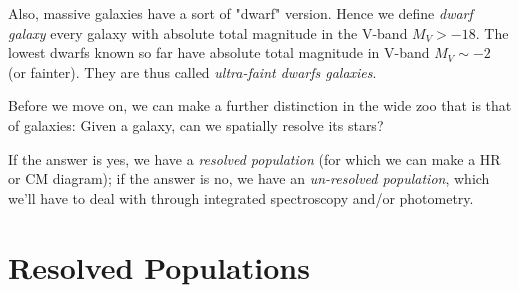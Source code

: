 \par Also, massive galaxies have a sort of "dwarf" version. Hence we define \emph{dwarf galaxy} every galaxy with absolute total magnitude in the V-band $M_{V}>-18$. The lowest dwarfs known so far have absolute total magnitude in V-band $M_{V}\sim-2$ (or fainter). They are thus called \emph{ultra-faint dwarfs galaxies}.
\par Before we move on, we can make a further distinction in the wide zoo that is that of galaxies: Given a galaxy, can we spatially resolve its stars?
\par If the answer is yes, we have a \emph{resolved population} (for which we can make a HR or CM diagram); if the answer is no, we have an \emph{un-resolved population}, which we'll have to deal with through integrated spectroscopy and/or photometry.

\section{Resolved Populations}

